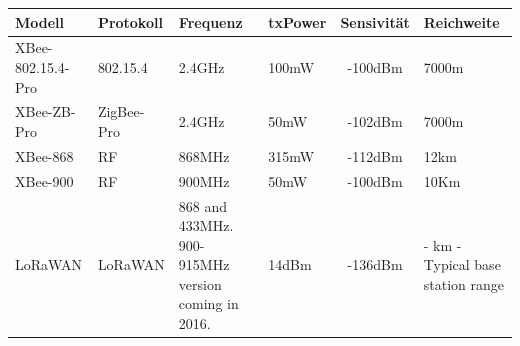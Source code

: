 \begin{landscape}

\begin{table}[H]
\centering
\begingroup
\setlength{\tabcolsep}{10pt} %
\renewcommand{\arraystretch}{1.5} %
\begin{tabulary}{\paperwidth}{m{3cm} m{2cm} m{4cm} m{4cm} C m{2cm}}

\textbf{Modell}            & \textbf{Protokoll}                & \textbf{Frequenz}                                                                                        & \textbf{txPower}                                                               & \textbf{Sensivität} & \textbf{Reichweite}               \\ \hline
XBee-802.15.4-Pro          & 802.15.4                          & 2.4GHz                                                                                                   & 100mW                                                                          & -100dBm             & 7000m                             \\
XBee-ZB-Pro                & ZigBee-Pro                        & 2.4GHz                                                                                                   & 50mW                                                                           & -102dBm             & 7000m                             \\
XBee-868                   & RF                                & 868MHz                                                                                                   & 315mW                                                                          & -112dBm             & 12km                              \\
XBee-900                   & RF                                & 900MHz                                                                                                   & 50mW                                                                           & -100dBm             & 10Km                              \\
LoRaWAN                    & LoRaWAN                           & 868 and 433MHz. 900- 915MHz version coming in 2016.                                                      & 14dBm                                                                          & -136dBm             & - km - Typical base station range \\

\end{tabulary}
\end{table}
\end{landscape}

